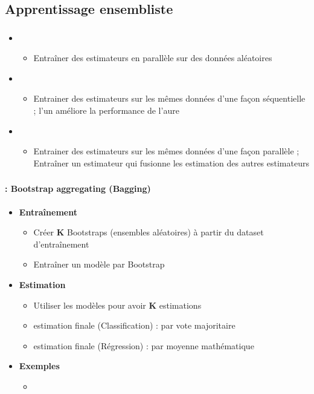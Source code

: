 \documentclass[xcolor=table]{beamer}
\begin{document}
\subsection{Apprentissage ensembliste}

\begin{frame}
	\frametitle{\insertsection}
	\framesubtitle{\insertsubsection}
	
	\begin{itemize}
		\item {}
		\begin{itemize}
			\item Entraîner des estimateurs en parallèle sur des données aléatoires
		\end{itemize}
		\item {}
		\begin{itemize}
			\item Entrainer des estimateurs sur les mêmes données d'une façon séquentielle ; l'un améliore la performance de l'aure
		\end{itemize}
		\item {}
		\begin{itemize}
			\item Entrainer des estimateurs sur les mêmes données d'une façon parallèle ; Entraîner un estimateur qui fusionne les estimation des autres estimateurs
		\end{itemize}
	\end{itemize}
	
\end{frame}

\begin{frame}
	\frametitle{\insertsection}
	\framesubtitle{\insertsubsection: Bootstrap aggregating (Bagging)}
	
	\begin{itemize}
		\item \textbf{Entraînement}
		\begin{itemize}
			\item Créer \textbf{K} Bootstraps (ensembles aléatoires) à partir du dataset d'entraînement
			\item Entraîner un modèle par Bootstrap
		\end{itemize}
		\item \textbf{Estimation}
		\begin{itemize}
			\item Utiliser les modèles pour avoir \textbf{K} estimations
			\item estimation finale (Classification) : par vote majoritaire
			\item estimation finale (Régression) : par moyenne mathématique
		\end{itemize}
		\item \textbf{Exemples}
		\begin{itemize}
			\item {}
		\end{itemize}
	\end{itemize}
	
\end{frame}
\end{document}
